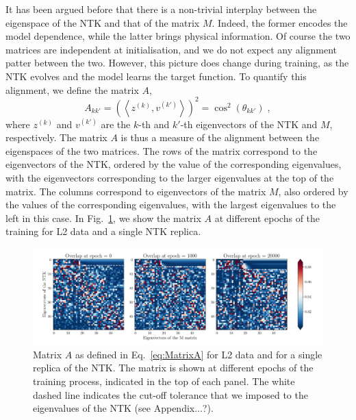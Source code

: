 It has been argued before that there is a non-trivial interplay between the
eigenspace of the NTK and that of the matrix $M$. Indeed, the former encodes the
model dependence, while the latter brings physical information. Of course the
two matrices are independent at initialisation, and we do not expect any
alignment patter between the two. However, this picture does change during
training, as the NTK evolves and the model learns the target function. To
quantify this alignment, we define the matrix $A$, 
\begin{equation}
  \label{eq:MatrixA}
  A_{kk'} = \left( \left< z^{(k)}, v^{(k')}\right> \right)^2 = \cos^2(\theta_{kk'}) \;,
\end{equation}
where $z^{(k)}$ and $v^{(k')}$ are the $k$-th and $k'$-th eigenvectors of the
NTK and $M$, respectively. The matrix $A$ is thus a measure of the alignment
between the eigenspaces of the two matrices. The rows of the matrix correspond to 
the eigenvectors of the NTK, ordered by the value of the corresponding eigenvalues, 
with the eigenvectors corresponding to the larger 
eigenvalues at the top of the matrix. The columns correspond to eigenvectors 
of the matrix $M$, also ordered by the values of the corresponding eigenvalues, 
with the largest eigenvalues to the left in this case. In Fig.~\ref{fig:NtkMAlign}, we
show the matrix $A$ at different epochs of the training for L2 data and a
single NTK replica. 
\begin{figure}[ht!]
  \centering
  \includegraphics[width=1\textwidth]{plots/ntk_pheno/ntk_alignment.pdf}
  \caption{Matrix $A$ as defined in Eq.~\eqref{eq:MatrixA} for L2 data and for a
  single replica of the NTK. The matrix is shown at different epochs of the
  training process, indicated in the top of each panel. The white dashed line
  indicates the cut-off tolerance that we imposed to the eigenvalues of the NTK
  (see Appendix...?).}
  \label{fig:NtkMAlign}
\end{figure}
